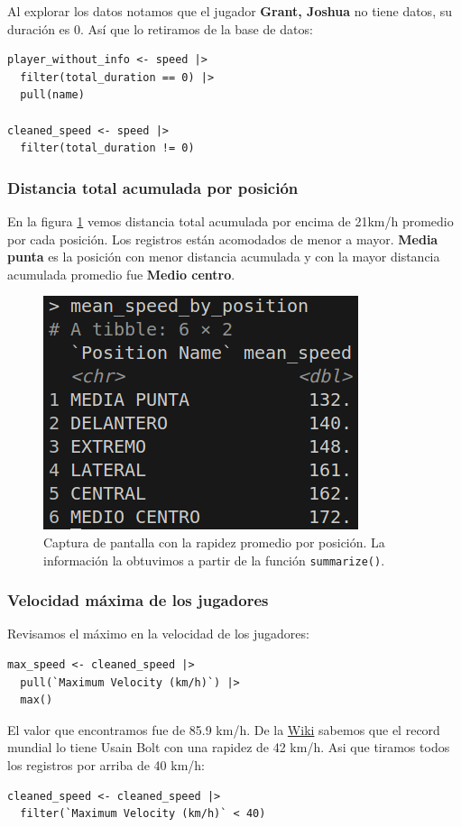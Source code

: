 Al explorar los datos notamos que el jugador \textbf{Grant, Joshua} no tiene datos, su duración es
0. Así que lo retiramos de la base de datos:
\begin{verbatim}
player_without_info <- speed |>
  filter(total_duration == 0) |>
  pull(name)

cleaned_speed <- speed |>
  filter(total_duration != 0)
\end{verbatim}


\subsubsection*{Distancia total acumulada por posición}
En la figura \ref{fig:meanSpeedPosition} vemos distancia total acumulada por encima de 21km/h
promedio por cada posición. Los registros están acomodados de menor a mayor.
\textbf{Media punta} es la posición con menor distancia acumulada y con la mayor distancia
acumulada promedio fue \textbf{Medio centro}.
\begin{figure}[H]
\centering
\includegraphics[scale=0.6]{../static/activity_1_5.png}
\caption{Captura de pantalla con la rapidez promedio por posición. La información la obtuvimos a 
partir de la función \texttt{summarize()}.}
\label{fig:meanSpeedPosition}
\end{figure}

\subsubsection*{Velocidad máxima de los jugadores}
Revisamos el máximo en la velocidad de los jugadores:
\begin{verbatim}
max_speed <- cleaned_speed |>
  pull(`Maximum Velocity (km/h)`) |>
  max()
\end{verbatim}
El valor que encontramos fue de 85.9 km/h. De la
\href{https://es.wikipedia.org/wiki/100_metros}{Wiki} sabemos que el record mundial lo tiene Usain
Bolt con una rapidez de 42 km/h. Asi que tiramos todos los registros por arriba de 40 km/h:
\begin{verbatim}
cleaned_speed <- cleaned_speed |>
  filter(`Maximum Velocity (km/h)` < 40)
\end{verbatim}


